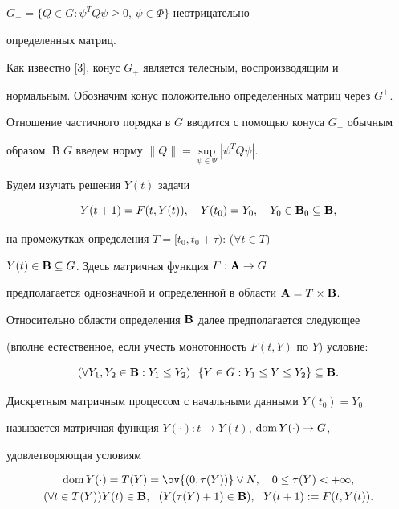 $G_+=\{Q\in G:\psi^T Q\psi\ge0$, $\psi\in\Phi\}$ неотрицательно


определенных матриц.





Как известно [3], конус $G_+$ является телесным, воспроизводящим и


нормальным. Обозначим конус положительно определенных матриц через $G^+$.


Отношение частичного порядка в $G$ вводится с помощью конуса $G_+$ обычным


образом. В $G$ введем норму $\|Q\|=\sup\limits_{\psi\in\Psi}|\psi^T


Q\psi|$.





Будем изучать решения $Y(t)$ задачи


\begin{equation}


Y(t+1)=F(t,Y(t)),\quad Y(t_0)=Y_0,\quad


Y_0\in\bold B_0\subseteq\bold B,


\end{equation}


на промежутках определения $T=[t_0,t_0+\tau)$: ($\forall t\in T$)


$Y(t)\in\bold B\subseteq G$. Здесь матричная функция $F:\bold A\to G$


предполагается однозначной и определенной в области $\bold A=T\times\bold


B$.





Относительно области определения $\bold B$ далее предполагается следующее


(вполне естественное, если учесть монотонность $F(t,Y)$ по $Y$) условие:


$$


(\forall Y_1,Y_2\in\bold B:Y_1\le Y_2)\ \ \{Y\in G:Y_1\le Y\le Y_2\}


\subseteq\bold B.


$$





Дискретным матричным процессом с начальными данными $Y(t_0)=Y_0$


называется матричная функция $Y(\cdot):t\to Y(t)$, $\operatorname{dom} Y(\cdot)\to G$,


удовлетворяющая условиям


\begin{gather*}


\dom Y(\cdot)=T(Y)=\ov{(0,\tau(Y))}\vee N,\quad


0\le\tau(Y)<+\infty,\\


(\forall t\in T(Y))Y(t)\in\bold B,\ \ (Y(\tau(Y)+1)\in\bold B),


\ \ Y(t+1):=F(t,Y(t)).


\end{gather*}





